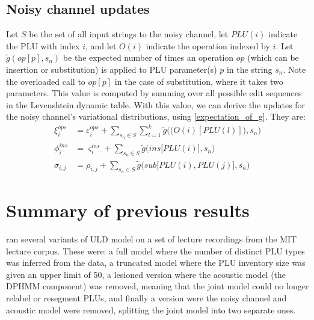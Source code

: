 \documentclass[12pt,letterpaper]{article}
\begin{document}
\subsection{Noisy channel updates}
Let $S$ be the set of all input strings to the noisy channel, let $PLU(i)$ indicate the PLU with index $i$, and let $O(i)$ indicate the operation indexed by $i$. Let $\tilde g(op[p], s_n)$ be the expected number of times an operation $op$ (which can be insertion or substitution) is applied to PLU parameter(s) $p$ in the string $s_n$. Note the overloaded call to $op[p]$ in the case of substitution, where it takes two parameters. This value is computed by summing over all possible edit sequences in the Levenshtein dynamic table. With this value, we can derive the updates for the noisy channel's variational distributions, using \eqref{expectation_of_g}. They are:
\begin{align*}
\nonumber \xi^{ops}_i &= \varepsilon^{ops}_i + \sum\limits_{s_n \in S}\sum\limits_{l = 1}^k \tilde g\Big(\big( O(i)[PLU(l)]\big), s_n\Big) \\
\nonumber \phi^{ins}_i &= \varsigma^{ins}_i + \sum\limits_{s_n \in S} \tilde g\Big(ins\big[PLU(i)\big], s_n\Big)\\
\nonumber \sigma_{i,j} &= \rho_{i,j} + \sum\limits_{s_n \in S} \tilde g\Big(sub\big[PLU(i), PLU(j)\big], s_n\Big)
\end{align*}

\section{Summary of previous results}
\citet{lee:2015} ran several variants of ULD model on a set of lecture recordings from the MIT lecture corpus. These were: a full model where the number of distinct PLU types was inferred from the data, a truncated model where the PLU inventory size was given an upper limit of 50, a lesioned version where the acoustic model (the DPHMM component) was removed, meaning that the joint model could no longer relabel or resegment PLUs, and finally a version were the noisy channel and acoustic model were removed, splitting the joint model into two separate ones. 
\end{document}
